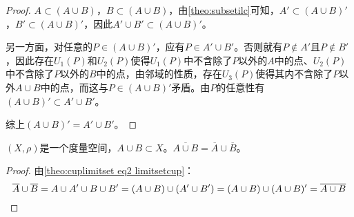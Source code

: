 \begin{proof}
	$A\subset (A\cup B)$，$B\subset (A\cup B)$，由\cref{theo:subsetilc}可知，$A'\subset(A\cup B)'$，$B'\subset(A\cup B)'$，因此$A'\cup B'\subset(A\cup B)'$。\par
	另一方面，对任意的$ P\in (A\cup B)'$，应有$P\in A'\cup B'$。否则就有$P\notin A'$且$P\notin B'$，因此存在$U_1(P)$和$U_2(P)$使得$U_1(P)$中不含除了$P$以外的$A$中的点、$U_2(P)$中不含除了$P$以外的$B$中的点，由邻域的性质，存在$U_3(P)$使得其内不含除了$P$以外$A\cup B$中的点，而这与$P\in (A\cup B)'$矛盾。由$P$的任意性有$(A\cup B)'\subset A'\cup B'$。\par
	综上$(A\cup B)'=A'\cup B'$。
\end{proof}
\begin{theorem}
	$(X,\rho)$是一个度量空间，$A\cup B\subset X$。$\overline{A\cup B}=\overline{A}\cup \overline{B}$。
\end{theorem}
\begin{proof}
	由\cref{theo:cuplimitset eq2 limitsetcup}：
	\begin{equation*}
		\overline{A}\cup \overline{B}=A\cup A'\cup B\cup B'
		=(A\cup B)\cup(A'\cup B')=(A\cup B)\cup(A\cup B)'
		=\overline{A\cup B}\qedhere
	\end{equation*}
\end{proof}
